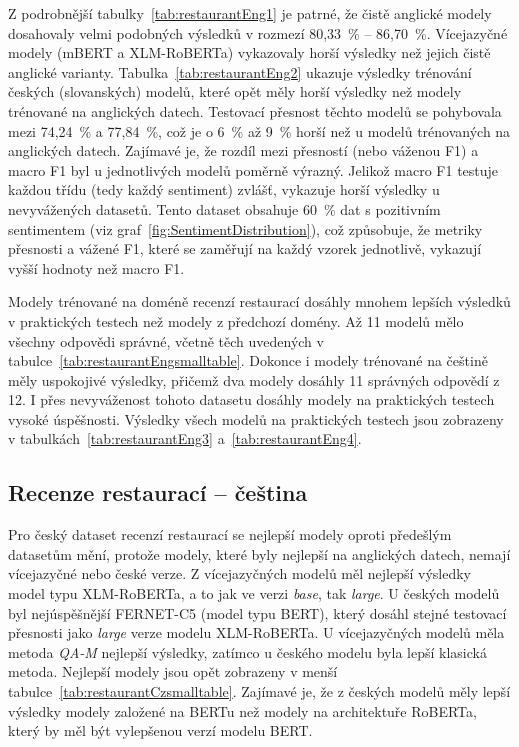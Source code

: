 Z podrobnější tabulky~\ref{tab:restaurantEng1} je patrné, že čistě anglické modely dosahovaly velmi podobných výsledků v rozmezí 80,33~\% -- 86,70~\%. Vícejazyčné modely (mBERT a XLM-RoBERTa) vykazovaly horší výsledky než jejich čistě anglické varianty. Tabulka~\ref{tab:restaurantEng2} ukazuje výsledky trénování českých (slovanských) modelů, které opět měly horší výsledky než modely trénované na anglických datech. Testovací přesnost těchto modelů se pohybovala mezi 74,24~\% a 77,84~\%, což je o 6~\% až 9~\% horší než u modelů trénovaných na anglických datech. Zajímavé je, že rozdíl mezi přesností (nebo váženou F1) a macro F1 byl u jednotlivých modelů poměrně výrazný. Jelikož macro F1 testuje každou třídu (tedy každý sentiment) zvlášť, vykazuje horší výsledky u nevyvážených datasetů. Tento dataset obsahuje 60~\% dat s pozitivním sentimentem (viz graf~\ref{fig:SentimentDistribution}), což způsobuje, že metriky přesnosti a vážené F1, které se zaměřují na každý vzorek jednotlivě, vykazují vyšší hodnoty než macro F1.

Modely trénované na doméně recenzí restaurací dosáhly mnohem lepších výsledků v praktických testech než modely z předchozí domény. Až 11 modelů mělo všechny odpovědi správné, včetně těch uvedených v tabulce~\ref{tab:restaurantEngsmalltable}. Dokonce i modely trénované na češtině měly uspokojivé výsledky, přičemž dva modely dosáhly 11 správných odpovědí z 12. I přes nevyváženost tohoto datasetu dosáhly modely na praktických testech vysoké úspěšnosti. Výsledky všech modelů na praktických testech jsou zobrazeny v tabulkách~\ref{tab:restaurantEng3} a~\ref{tab:restaurantEng4}.

\subsection{Recenze restaurací -- čeština}
Pro český dataset recenzí restaurací se nejlepší modely oproti předešlým datasetům mění, protože modely, které byly nejlepší na anglických datech, nemají vícejazyčné nebo české verze. Z vícejazyčných modelů měl nejlepší výsledky model typu XLM-RoBERTa, a to jak ve verzi \emph{base}, tak \emph{large}. U českých modelů byl nejúspěšnější FERNET-C5 (model typu BERT), který dosáhl stejné testovací přesnosti jako \emph{large} verze modelu XLM-RoBERTa. U vícejazyčných modelů měla metoda \emph{QA-M} nejlepší výsledky, zatímco u českého modelu byla lepší klasická metoda. Nejlepší modely jsou opět zobrazeny v menší tabulce~\ref{tab:restaurantCzsmalltable}. Zajímavé je, že z českých modelů měly lepší výsledky modely založené na BERTu než modely na architektuře RoBERTa, který by měl být vylepšenou verzí modelu BERT.

